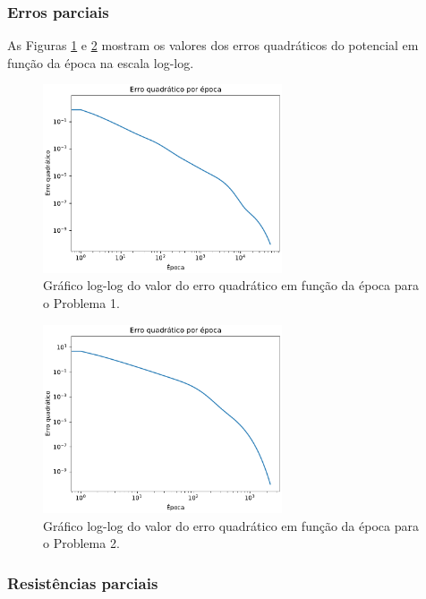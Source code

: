 \documentclass{aleph-revista}
\begin{document}
\subsubsection{Erros parciais}

As Figuras \ref{fig:erro_p1} e \ref{fig:erro_p2} mostram os valores dos erros quadráticos do potencial em função da época na escala log-log.

\begin{figure}[!ht]
  \centering
  \includegraphics[width=0.63\textwidth]{p1_hist}
  \caption{Gráfico log-log do valor do erro quadrático em função da época para o Problema 1.}
  \label{fig:erro_p1}
\end{figure}

\begin{figure}[!ht]
  \centering
  \includegraphics[width=0.63\textwidth]{p2_hist}
  \caption{Gráfico log-log do valor do erro quadrático em função da época para o Problema 2.}
  \label{fig:erro_p2}
\end{figure}


\subsubsection{Resistências parciais}
\end{document}
